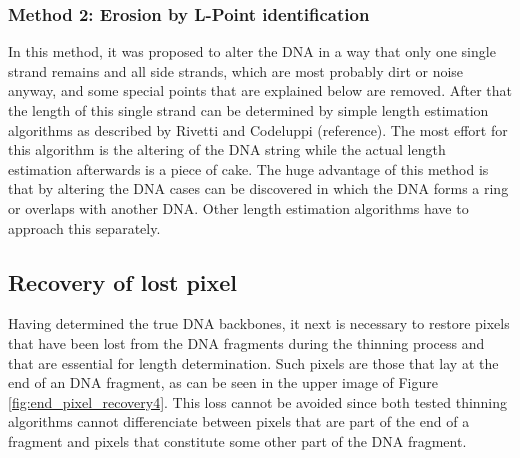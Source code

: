 \documentclass{article}
\begin{document}
\subsubsection{Method 2: Erosion by L-Point identification}
In this method, it was proposed to alter the DNA in a way that only one single strand remains and all side strands, which are most probably dirt or noise anyway, and some special points that are explained below are removed. After that the length of this single strand can be determined by simple length estimation algorithms as described by Rivetti and Codeluppi (reference). The most effort for this algorithm is the altering of the DNA string while the actual length estimation afterwards is a piece of cake. The huge advantage of this method is that by altering the DNA cases can be discovered in which the DNA forms a ring or overlaps with another DNA. Other length estimation algorithms have to approach this separately.


\subsection{Recovery of lost pixel}\label{sec:PixelRecovery}
Having determined the true DNA backbones, it next is necessary to restore pixels that have been lost from the DNA fragments during the thinning process and that are essential for length determination. Such pixels are those that lay at the end of an DNA fragment, as can be seen in the upper image of Figure \ref{fig:end_pixel_recovery4}. This loss cannot be avoided since both tested thinning algorithms cannot differenciate between pixels that are part of the end of a fragment and pixels that constitute some other part of the DNA fragment. 
\end{document}
